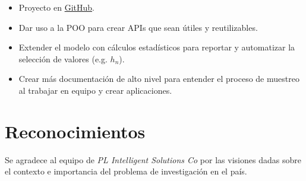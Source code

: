 \documentclass{article}
\begin{document}
\begin{itemize}
    \item Proyecto en \href{https://github.com/tobiasbriones/cp-unah-mm700-agricultural-soil-sampling-for-data-analysis}{GitHub}.

    \item Dar uso a la POO para crear APIs que sean útiles y reutilizables.

    \item Extender el modelo con cálculos estadísticos para reportar y automatizar la selección de valores (e.g. $h_n$).

    \item Crear más documentación de alto nivel para entender el proceso de muestreo al trabajar en equipo y crear aplicaciones.
\end{itemize}

\section{Reconocimientos}

Se agradece al equipo de \textit{PL Intelligent Solutions Co} por las visiones dadas sobre el contexto e importancia del problema de investigación en el país.

\printbibliography
\end{document}
